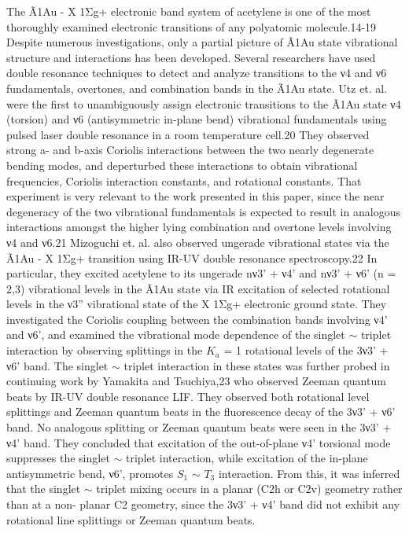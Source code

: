 \documentclass[12pt,draft]{mitthesis}
\begin{document}
The Ã1Au - X 1Σg+ electronic band system of acetylene is one of the
most thoroughly examined electronic transitions of any polyatomic
molecule.14-19 Despite numerous investigations, only a partial picture
of Ã1Au state vibrational structure and interactions has been
developed. Several researchers have used double resonance techniques
to detect and analyze transitions to the ν4 and ν6 fundamentals,
overtones, and combination bands in the Ã1Au state. Utz et. al. were
the first to unambiguously assign electronic transitions to the Ã1Au
state ν4 (torsion) and ν6 (antisymmetric in-plane bend) vibrational
fundamentals using pulsed laser double resonance in a room temperature
cell.20 They observed strong a- and b-axis Coriolis interactions
between the two nearly degenerate bending modes, and deperturbed these
interactions to obtain vibrational frequencies, Coriolis interaction
constants, and rotational constants.  That experiment is very relevant
to the work presented in this paper, since the near degeneracy of the
two vibrational fundamentals is expected to result in analogous
interactions amongst the higher lying combination and overtone levels
involving ν4 and ν6.21 Mizoguchi et. al. also observed ungerade
vibrational states via the Ã1Au - X 1Σg+ transition using IR-UV
double resonance spectroscopy.22 In particular, they excited acetylene
to its ungerade nν3’ + ν4’ and nν3’ + ν6’ (n = 2,3)
vibrational levels in the Ã1Au state via IR excitation of selected
rotational levels in the ν3” vibrational state of the X 1Σg+
electronic ground state.  They investigated the Coriolis coupling
between the combination bands involving ν4’ and ν6’, and examined
the vibrational mode dependence of the singlet $\sim$ triplet interaction
by observing splittings in the $K_a$ = 1 rotational levels of the
3ν3’ + ν6’ band. The singlet $\sim$ triplet interaction in these states
was further probed in continuing work by Yamakita and Tsuchiya,23 who
observed Zeeman quantum beats by IR-UV double resonance LIF. They
observed both rotational level splittings and Zeeman quantum beats in
the fluorescence decay of the 3ν3’ + ν6’ band.  No analogous
splitting or Zeeman quantum beats were seen in the
3ν3’ + ν4’ band. They concluded that excitation of the
out-of-plane ν4’ torsional mode suppresses the singlet $\sim$ triplet
interaction, while excitation of the in-plane antisymmetric bend, ν6’,
promotes $S_1$ $\sim$ $T_3$ interaction. From this, it was inferred that the
singlet $\sim$ triplet mixing occurs in a planar (C2h or C2v) geometry
rather than at a non- planar C2 geometry, since the
3ν3’ + ν4’ band did not exhibit any rotational line splittings or
Zeeman quantum beats.
\end{document}

